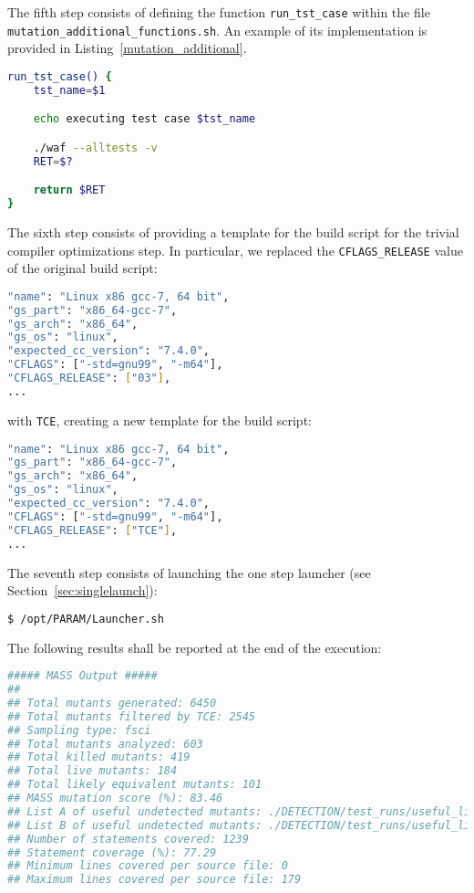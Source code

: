 The fifth step consists of defining the function \texttt{run\_tst\_case} within the file \\\texttt{mutation\_additional\_functions.sh}. An example of its implementation is provided in Listing~\ref{mutation_additional}.

\begin{lstlisting}[language=bash, label=mutation_additional, caption='run\_tst\_case' Bash function for PARAM. Excerpt of mutation\_additional\_functions.sh file.]
run_tst_case() {
    tst_name=$1

    echo executing test case $tst_name

    ./waf --alltests -v
    RET=$?

    return $RET
}
\end{lstlisting}

The sixth step consists of providing a template for the build script for the trivial compiler optimizations step. In particular, we replaced the \texttt{CFLAGS\_RELEASE} value of the original build script: 

\begin{lstlisting}[language=bash, caption=libparam/tools/buildtools/gs/buildtools/compiler\_settings.json]
"name": "Linux x86 gcc-7, 64 bit",
"gs_part": "x86_64-gcc-7",
"gs_arch": "x86_64",
"gs_os": "linux",
"expected_cc_version": "7.4.0",
"CFLAGS": ["-std=gnu99", "-m64"],
"CFLAGS_RELEASE": ["03"],
... 
\end{lstlisting}

with \texttt{TCE}, creating a new template for the build script:

\begin{lstlisting}[language=bash, caption=libparam/tools/buildtools/gs/buildtools/compiler\_settings.json.template]
"name": "Linux x86 gcc-7, 64 bit",
"gs_part": "x86_64-gcc-7",
"gs_arch": "x86_64",
"gs_os": "linux",
"expected_cc_version": "7.4.0",
"CFLAGS": ["-std=gnu99", "-m64"],
"CFLAGS_RELEASE": ["TCE"],
...
\end{lstlisting}

The seventh step consists of launching the one step launcher (see Section~\ref{sec:singlelaunch}):

\begin{lstlisting}[language=bash]
 $ /opt/PARAM/Launcher.sh
\end{lstlisting}

The following results shall be reported at the end of the execution:

\begin{lstlisting}[language=bash, label=mass_output, caption=\MASS output.]
##### MASS Output #####
##
## Total mutants generated: 6450
## Total mutants filtered by TCE: 2545
## Sampling type: fsci
## Total mutants analyzed: 603
## Total killed mutants: 419
## Total live mutants: 184
## Total likely equivalent mutants: 101
## MASS mutation score (%): 83.46
## List A of useful undetected mutants: ./DETECTION/test_runs/useful_list_a
## List B of useful undetected mutants: ./DETECTION/test_runs/useful_list_b
## Number of statements covered: 1239
## Statement coverage (%): 77.29
## Minimum lines covered per source file: 0
## Maximum lines covered per source file: 179
\end{lstlisting}